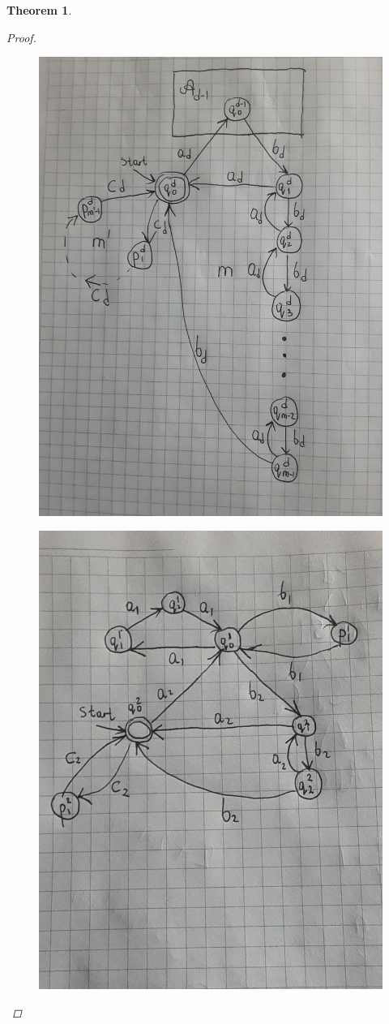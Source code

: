 \documentclass[11pt,a4paper]{article} %
\newtheorem{theorem}{Theorem}
\begin{document}
\begin{theorem}
\begin{proof}
\begin{figure}
\centering
\begin{minipage}{.5\textwidth}
  \centering
  \includegraphics[width=.8\linewidth]{example_gen.jpg}
  \label{dimautomata:generalized}
\end{minipage}%
\begin{minipage}{.5\textwidth}
  \centering
  \includegraphics[width=.8\linewidth]{example2.jpg}
  \label{dimautomata:2}
\end{minipage}
\end{figure}


\end{proof}
\end{theorem}
\end{document}
